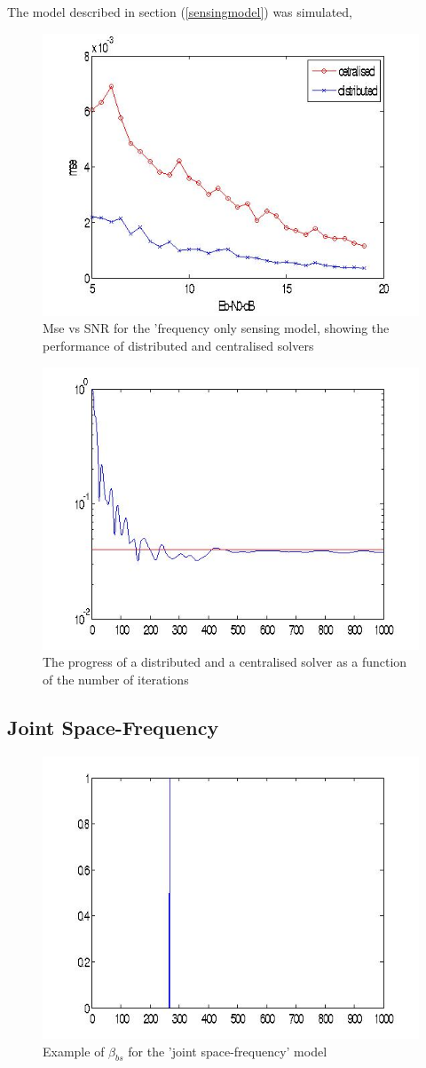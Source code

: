 \documentclass{article}
\begin{document}
The model described in section (\ref{sensingmodel}) was simulated, 

\begin{figure}[h]
\centering
\includegraphics[height = 5 cm]{centvsdistmsegaussian10perpoint.jpg}
\caption{Mse vs SNR for the 'frequency only sensing model, showing the performance of distributed and centralised solvers}
\label{msevssnr1}
\end{figure}

\begin{figure}[h]
\centering
\includegraphics[height = 5 cm]{erroriterations1.jpg}
\caption{The progress of a distributed and a centralised solver as a function of the number of iterations }
\label{erroriterations}
\end{figure}

\subsection{Joint Space-Frequency}

\begin{figure}[h]
\centering
\includegraphics[height = 5 cm]{betabs.jpg}
\caption{Example of \(\beta_{bs}\) for the 'joint space-frequency' model}
\label{beta}
\end{figure}
\end{document}
